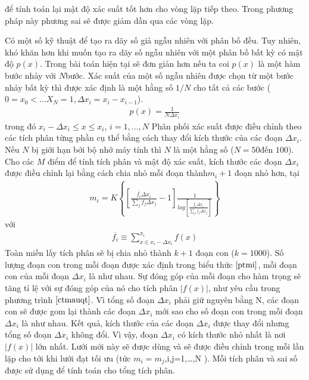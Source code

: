 để tính toán lại mật độ xác suất tốt hơn cho vòng lặp tiếp theo. 
Trong phương pháp này phương sai sẽ được giảm dần qua các vòng lặp.\par
Có một số kỹ thuật để tạo ra dãy số giả ngẫu nhiên với phân bố đều. 
Tuy nhiên, khó khăn hơn khi muốn tạo ra dãy số ngẫu nhiên với một phân bố bất kỳ có mật độ $p(x)$. 
Trong bài toán hiện tại sẽ đơn giản hơn nếu ta coi $p(x)$ là một hàm bước nhảy với $N$bước. 
Xác suất của một số ngẫu nhiên được chọn từ một bước nhảy bất kỳ thì được xác định là một hằng số $1/N$ cho tất cả các bước ($0=x_0 < … X_N =1, {\Delta}x_i = x_i-x_{i-1}$).
\begin{align}
      p(x)=\frac{1}{N{\Delta}x_i}
\end{align}
trong đó $x_i-{\Delta}x_i\leq x \leq x_i$, $i=1, ...,N $ 
Phân phối xác suất được điều chỉnh theo các tích phân từng phần cụ thể bằng cách thay đổi kích thước của các đoạn ${\Delta}x_i$. Nếu $N$ bị giới hạn bởi bộ nhớ máy tính  thì $N$ là một hằng số ($N = 50 $đến $100$).
Cho các $M$ điểm để tính tích phân và mật độ xác suất, kích thước các đoạn ${\Delta}x_i$ được điều chỉnh lại bằng cách chia nhỏ mỗi đoạn thành$ m_i + 1$ đoạn nhỏ hơn, tại
\begin{align}
      m_i=K\left\{ \left[ \frac{\overline{f_i}{\Delta}x_i}{\sum_j{f_j{\Delta}x_j}}-1\right]{\frac{1}{log\left[ {\frac{\overline{f_i}{\Delta}x_i}{\sum_j\overline{f_j}{\Delta}x_j}}\right]}}\right\}\label{ptmi}
\end{align}
với
\begin{align}
      \overline{f_i} \equiv {\sum_{x\in{x_i-\Delta}x_i}^{x_i}}{f(x)}\label{pt3.12}
\end{align}
Toàn miền lấy tích phân sẽ bị chia nhỏ thành $k+1$ đoạn con ($k=1000$). \label{giaithichmi}
Số lượng đoạn con trong mỗi đoạn được xác định trong biểu thức $ \ref{ptmi} $,
mỗi đoạn con của mỗi đoạn ${\Delta}x_i $ là như nhau. Sự đóng góp của mỗi đoạn cho hàm trọng sẽ tăng tỉ lệ với sự đóng góp của nó cho tích phân $|f(x)|$, 
như yêu cầu trong phương trình $ \ref{ctmauqt}$. Vì tổng số đoạn ${\Delta}x_i $ phải giữ nguyên bằng N, 
các đoạn con sẽ được gom lại thành các đoạn ${\Delta}x_i $ mới sao cho số đoạn con trong mỗi đoạn ${\Delta}x_i $ là như nhau. 
Kết quả, kích thước của các đoạn ${\Delta}x_i $ được thay đổi nhưng tổng số đoạn ${\Delta}x_i $ không đổi. Vì vậy, đoạn ${\Delta}x_i $ có kích thước nhỏ nhất là nơi $|f(x)|$ lớn nhất. 
Lưới mới này sẽ được dùng và sẽ được điều chỉnh trong mỗi lần lặp cho tới khi lưới đạt tối ưu (tức $m_i=m_j$,i,j=1,…,N ). 
Mỗi tích phân và sai số được sử dụng để tính toán cho tổng tích phân.\par
